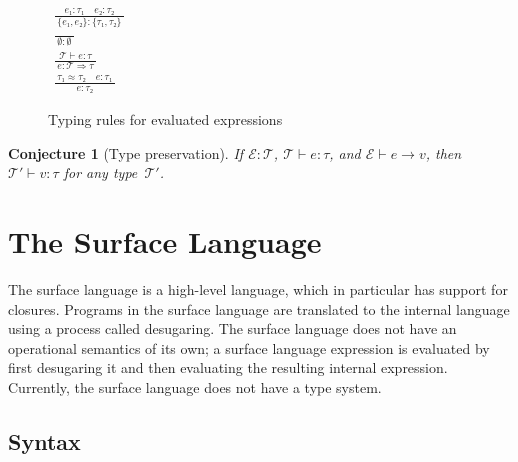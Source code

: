 \documentclass{scrartcl}
\newenvironment{mathfigure}[2]
    {%
        \begin{figure}
        \newcommand{\figurelabel}{#1}
        \newcommand{\figurecaption}{#2}
        \centering
        \begin{math}
    }
    {
        \end{math}
        \caption{\figurecaption}
        \label{\figurelabel}
        \end{figure}%
    }
\newtheorem{conjecture}{Conjecture}
\newcommand{\deriv}[2]{\frac{\;#1\;}{\;#2\;}}
\newcommand{\derivlinedone}{\\[1.5ex]}
\newcommand{\nexthyp}{\quad}
\begin{document}
\begin{mathfigure}{typing-rules-for-evaluated-expressions}
                  {Typing rules for evaluated expressions}
%
\begin{gathered}
%
\deriv{e₁ : τ₁ \nexthyp e₂ : τ₂}{\{e₁, e₂\} : \{τ₁, τ₂\}}
\derivlinedone
\deriv{}{∅ : ∅}
\derivlinedone
\deriv{𝒯 ⊢ e : τ}{e : 𝒯 ⇒ τ}
\derivlinedone
\deriv{τ₁ ≈ τ₂ \nexthyp e : τ₁}{e : τ₂}
%
\end{gathered}
%
\end{mathfigure}

\begin{conjecture}[Type preservation]

If $ℰ : 𝒯$, $𝒯 ⊢ e : τ$, and $ℰ ⊢ e → v$, then $𝒯′ ⊢ v : τ$ for any
type~$𝒯'$.

\end{conjecture}

\section{The Surface Language}
\label{the-surface-language}

The surface language is a high-level language, which in particular has
support for closures. Programs in the surface language are translated to
the internal language using a process called desugaring. The surface
language does not have an operational semantics of its own; a surface
language expression is evaluated by first desugaring it and then
evaluating the resulting internal expression. Currently, the surface
language does not have a type system.

\subsection{Syntax}
\end{document}
